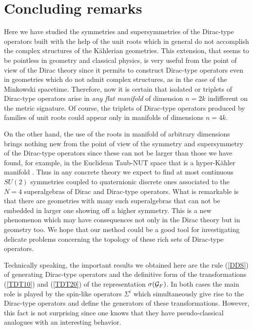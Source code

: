 \documentclass[a4paper,12pt]{article}
\begin{document}
\section{Concluding remarks}

Here we have studied the symmetries and  supersymmetries of the 
Dirac-type operators built with the help of the unit roots which in
general do not accomplish the complex structures of the K\" ahlerian geometries. 
This extension, that seems to be pointless in geometry and 
classical physics, is very useful from the point of view of the Dirac theory 
since it permits to construct Dirac-type operators even in geometries which do 
not admit complex structures, as in the case of the 
Minkowski spacetime. Therefore, now it is certain that isolated  
or triplets of Dirac-type operators arise in {\em any flat manifold} 
of dimension $n=2k$ indifferent on the metric signature.    
Of course,  the triplets of Dirac-type operators produced by families of unit 
roots could appear only in  manifolds of dimensions $n=4k$.
 
On the other hand, the use of the roots in manifold of arbitrary dimensions 
brings nothing new from the point of view of the symmetry and 
supersymmetry of the Dirac-type operators since these can not be larger than 
those we have found, for example, in the Euclidean Taub-NUT space that is a 
hyper-K\" ahler manifold \cite{CV,CV1}. Thus in any concrete theory we expect 
to find at most continuous $SU(2)$ symmetries coupled to quaternionic discrete 
ones  associated to the $N=4$ superalgebras of Dirac and Dirac-type operators. 
What is remarkable is that there are geometries with many such superalgebras 
that can not be embedded in larger one showing off a higher symmetry. This 
is a new phenomenon which may have consequences not only in the Dirac theory 
but in geometry too. We hope that our method could be a good tool for 
investigating delicate problems concerning the topology of these rich sets of 
Dirac-type operators. 

Technically speaking, the important results we obtained here are the 
rule (\ref{DDS}) of generating Dirac-type operators and the definitive form of 
the transformations (\ref{TDT10}) and (\ref{TDT20}) of the representation 
$\sigma({\cal G}_F)$. In both cases the main role is played by the spin-like 
operators $\Sigma^i$ which simultaneously give rise to the Dirac-type 
operators  and define the generators of these transformations. However, this
fact is not surprising since one knows that they have  pseudo-classical
analogues with an interesting behavior. 
\end{document}
